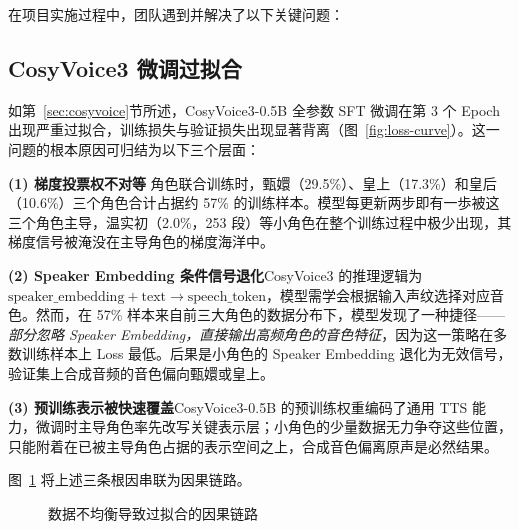 \documentclass[12pt,a4paper]{article}
\begin{document}
在项目实施过程中，团队遇到并解决了以下关键问题：

\subsection{CosyVoice3 微调过拟合}
\label{sec:prob-overfit}

如第~\ref{sec:cosyvoice}节所述，CosyVoice3-0.5B 全参数 SFT 微调在第 3 个 Epoch 出现严重过拟合，训练损失与验证损失出现显著背离（图~\ref{fig:loss-curve}）。这一问题的根本原因可归结为以下三个层面：

\textbf{(1) 梯度投票权不对等} 角色联合训练时，甄嬛（29.5\%）、皇上（17.3\%）和皇后（10.6\%）三个角色合计占据约 57\% 的训练样本。模型每更新两步即有一歩被这三个角色主导，温实初（2.0\%，253 段）等小角色在整个训练过程中极少出现，其梯度信号被淹没在主导角色的梯度海洋中。

\textbf{(2) Speaker Embedding 条件信号退化}\quad CosyVoice3 的推理逻辑为 $\text{speaker\_embedding} + \text{text} \to \text{speech\_token}$，模型需学会根据输入声纹选择对应音色。然而，在 57\% 样本来自前三大角色的数据分布下，模型发现了一种捷径——\textit{部分忽略 Speaker Embedding，直接输出高频角色的音色特征}，因为这一策略在多数训练样本上 Loss 最低。后果是小角色的 Speaker Embedding 退化为无效信号，验证集上合成音频的音色偏向甄嬛或皇上。

\textbf{(3) 预训练表示被快速覆盖}\quad CosyVoice3-0.5B 的预训练权重编码了通用 TTS 能力，微调时主导角色率先改写关键表示层；小角色的少量数据无力争夺这些位置，只能附着在已被主导角色占据的表示空间之上，合成音色偏离原声是必然结果。

图~\ref{fig:overfit-chain} 将上述三条根因串联为因果链路。

\begin{figure}[H]
\centering
{}
\caption{数据不均衡导致过拟合的因果链路}
\label{fig:overfit-chain}
\end{figure}
\end{document}
